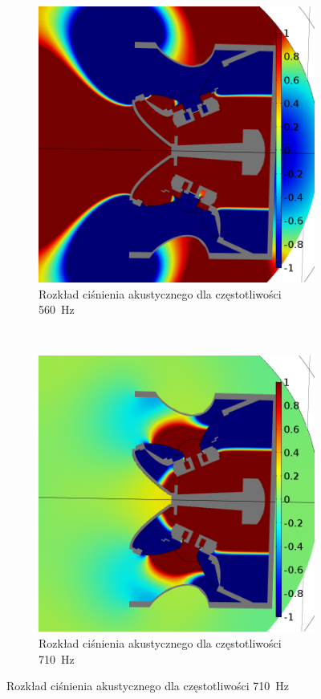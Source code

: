 \documentclass[12pt]{oska}
\begin{document}
\begin{figure}[!ht]
			\begin{subfigure}[b]{.49\textwidth}
			\includegraphics[width=\textwidth]{pres_sig_560Hz.png}
				\caption{Rozkład ciśnienia akustycznego dla częstotliwości \SI{560}{\hertz}}
				\label{r:C_560}
			\end{subfigure}
			~
			\begin{subfigure}[b]{.49\textwidth}
			\includegraphics[width=\textwidth]{pres_sig_710Hz.png}
				\caption{Rozkład ciśnienia akustycznego dla częstotliwości \SI{710}{\hertz}}
				\label{r:C_710}
			\end{subfigure}
			

\end{figure}
\end{document}
